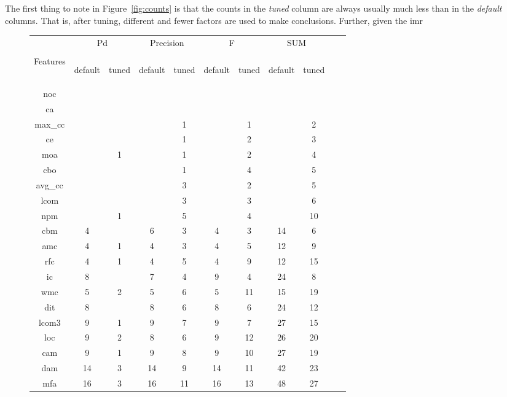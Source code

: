 \documentclass{sig-alternative}
\newcommand{\fig}[1]{Figure~\ref{fig:#1}}
\def\baselinestretch{1}
\begin{document}
The first thing to note in \fig{counts} is that the counts in the {\em tuned} column are always usually
much less than in the {\em default} columns. That is, after tuning, different and fewer factors
are used to make conclusions. Further, given the imr
\begin{figure}[!h]

\renewcommand{\baselinestretch}{0.8}
\scriptsize
\centering
  \begin{tabular}{c|c c|c c|c c|c c| c c }
  
    & \multicolumn{2}{c|}{Pd} &  \multicolumn{2}{c|}{Precision} & \multicolumn{2}{c|}{F} &  \multicolumn{2}{c|}{SUM}\\
 &&&&&&&&\\
Features& \begin{sideways}default\end{sideways}
& \begin{sideways}tuned\end{sideways}
& \begin{sideways}default\end{sideways}
& \begin{sideways}tuned\end{sideways}
& \begin{sideways}default\end{sideways}
& \begin{sideways}tuned\end{sideways}
& \begin{sideways}default\end{sideways}
& \begin{sideways}tuned\end{sideways}
\\\hline
noc& & & & & & &  & \\
ca& & & & & & &  & \\
max\_cc& & & & 1& & 1&  & 2\\
ce& & & & 1& & 2&  & 3\\
moa& & 1& & 1& & 2&  & 4\\
cbo& & & & 1& & 4&  & 5\\
avg\_cc& & & & 3& & 2&  & 5\\
lcom& & & & 3& & 3&  & 6\\
npm& & 1& & 5& & 4&  & 10\\
cbm& 4& & 6& 3& 4& 3& 14 & 6\\
amc& 4& 1& 4& 3& 4& 5& 12 & 9\\
rfc& 4& 1& 4& 5& 4& 9& 12 & 15\\
ic& 8& & 7& 4& 9& 4& 24 & 8\\
wmc& 5& 2& 5& 6& 5& 11& 15 & 19\\
dit& 8& & 8& 6& 8& 6& 24 & 12\\
lcom3& 9& 1& 9& 7& 9& 7& 27 & 15\\
loc& 9& 2& 8& 6& 9& 12& 26 & 20\\
cam& 9& 1& 9& 8& 9& 10& 27 & 19\\
dam& 14& 3& 14& 9& 14& 11& 42 & 23\\
mfa& 16& 3& 16& 11& 16& 13& 48 & 27\\


\end{tabular}
\end{figure}
\end{document}
